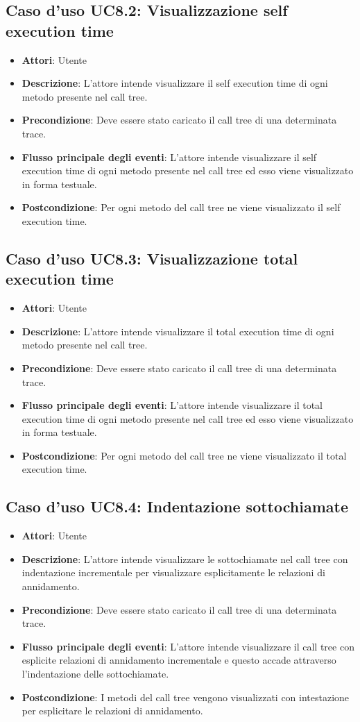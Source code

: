 \subsection{Caso d'uso UC8.2: Visualizzazione self execution time}
\begin{itemize}
\item \textbf{Attori}: Utente
\item \textbf{Descrizione}: L'attore intende visualizzare il self execution time di ogni metodo presente nel call tree.
\item \textbf{Precondizione}: Deve essere stato caricato il call tree di una determinata trace.
\item \textbf{Flusso principale degli eventi}: L'attore intende visualizzare il self execution time di ogni metodo presente nel call tree ed esso viene visualizzato in forma testuale.
\item \textbf{Postcondizione}: Per ogni metodo del call tree ne viene visualizzato il self execution time.
\end{itemize}
\subsection{Caso d'uso UC8.3: Visualizzazione total execution time}
\begin{itemize}
\item \textbf{Attori}: Utente
\item \textbf{Descrizione}: L'attore intende visualizzare il total execution time di ogni metodo presente nel call tree.
\item \textbf{Precondizione}: Deve essere stato caricato il call tree di una determinata trace.
\item \textbf{Flusso principale degli eventi}: L'attore intende visualizzare il total execution time di ogni metodo presente nel call tree ed esso viene visualizzato in forma testuale.
\item \textbf{Postcondizione}: Per ogni metodo del call tree ne viene visualizzato il total execution time.
\end{itemize}
\subsection{Caso d'uso UC8.4: Indentazione sottochiamate}
\begin{itemize}
\item \textbf{Attori}: Utente
\item \textbf{Descrizione}: L'attore intende visualizzare le sottochiamate nel call tree con indentazione incrementale per visualizzare esplicitamente le relazioni di annidamento.
\item \textbf{Precondizione}: Deve essere stato caricato il call tree di una determinata trace.
\item \textbf{Flusso principale degli eventi}: L'attore intende visualizzare il call tree con esplicite relazioni di annidamento incrementale e questo accade attraverso l'indentazione delle sottochiamate.

\item \textbf{Postcondizione}: I metodi del call tree vengono visualizzati con intestazione per esplicitare le relazioni di annidamento.
\end{itemize}

